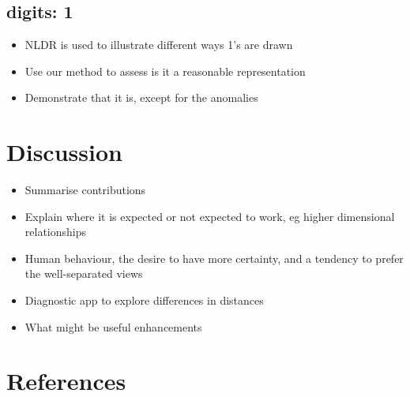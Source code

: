 \documentclass[
  12pt]{article}
\providecommand{\tightlist}{%
  \setlength{\itemsep}{0pt}\setlength{\parskip}{0pt}}\usepackage{longtable,booktabs,array}
\begin{document}
\subsection{digits: 1}\label{digits-1}

\begin{itemize}
\tightlist
\item
  NLDR is used to illustrate different ways 1's are drawn
\item
  Use our method to assess is it a reasonable representation
\item
  Demonstrate that it is, except for the anomalies
\end{itemize}

\section{Discussion}\label{sec-discussion}

\begin{itemize}
\tightlist
\item
  Summarise contributions
\item
  Explain where it is expected or not expected to work, eg higher
  dimensional relationships
\item
  Human behaviour, the desire to have more certainty, and a tendency to
  prefer the well-separated views
\item
  Diagnostic app to explore differences in distances
\item
  What might be useful enhancements
\end{itemize}

\section*{References}\label{references}

\renewcommand{\bibsection}{}


\newpage{}
\end{document}
